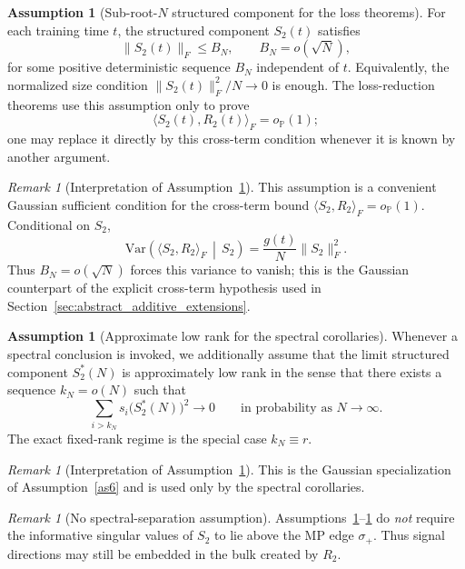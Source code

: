\documentclass[11pt]{article}
\theoremstyle{plain}
\theoremstyle{definition}
\newtheorem{assumption}[thm]{Assumption}
\theoremstyle{remark}
\newtheorem{rem}[thm]{Remark}
\newcommand{\PP}{\mathbb{P}}
\newcommand{\1}{\mathbf{1}}
\begin{document}
\begin{assumption}[Sub-root-\(N\) structured component for the loss theorems]
\label{as3}
For each training time \(t\), the structured component \(S_2(t)\) satisfies
\[
\|S_2(t)\|_F\le B_N,
\qquad
B_N=o(\sqrt N),
\]
for some positive deterministic sequence \(B_N\) independent of \(t\). Equivalently, the normalized size condition \(\|S_2(t)\|_F^2/N\to0\) is enough. The loss-reduction theorems use this assumption only to prove
\[
\langle S_2(t),R_2(t)\rangle_F=o_{\PP}(1);
\]
one may replace it directly by this cross-term condition whenever it is known by another argument.
\end{assumption}

\begin{rem}[Interpretation of Assumption~\ref{as3}]
This assumption is a convenient Gaussian sufficient condition for the cross-term bound \(\langle S_2,R_2\rangle_F=o_{\PP}(1)\).  Conditional on \(S_2\),
\[
\mathrm{Var}\!\left(\langle S_2,R_2\rangle_F\,\middle|\,S_2\right)
=
\frac{g(t)}{N}\|S_2\|_F^2.
\]
Thus \(B_N=o(\sqrt N)\) forces this variance to vanish; this is the Gaussian counterpart of the explicit cross-term hypothesis used in Section~\ref{sec:abstract_additive_extensions}.
\end{rem}

\begin{assumption}[Approximate low rank for the spectral corollaries]
\label{as3spectral}
Whenever a spectral conclusion is invoked, we additionally assume that the limit structured component \(S_2^*(N)\) is approximately low rank in the sense that there exists a sequence \(k_N=o(N)\) such that
\[
\sum_{i>k_N}s_i\!\big(S_2^*(N)\big)^2\to0
\qquad\text{in probability as }N\to\infty.
\]
The exact fixed-rank regime is the special case \(k_N\equiv r\).
\end{assumption}

\begin{rem}[Interpretation of Assumption~\ref{as3spectral}]
This is the Gaussian specialization of Assumption~\ref{as6} and is used only by the spectral corollaries.
\end{rem}

\begin{rem}[No spectral-separation assumption]
Assumptions~\ref{as3}--\ref{as3spectral} do \emph{not} require the informative singular values of \(S_2\) to lie above the MP edge \(\sigma_+\). Thus signal directions may still be embedded in the bulk created by \(R_2\).
\end{rem}
\end{document}
